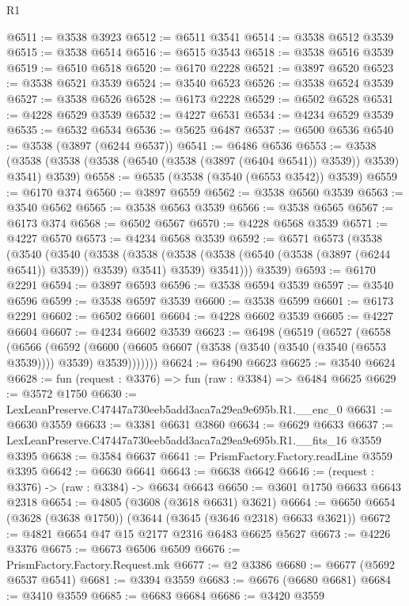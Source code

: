\begin{lexlean}{R1}
\begin{coremodule}
@6511 := @3538 @3923
@6512 := @6511 @3541
@6514 := @3538 @6512 @3539
@6515 := @3538 @6514
@6516 := @6515 @3543
@6518 := @3538 @6516 @3539
@6519 := @6510 @6518
@6520 := @6170 @2228
@6521 := @3897 @6520
@6523 := @3538 @6521 @3539
@6524 := @3540 @6523
@6526 := @3538 @6524 @3539
@6527 := @3538 @6526
@6528 := @6173 @2228
@6529 := @6502 @6528
@6531 := @4228 @6529 @3539
@6532 := @4227 @6531
@6534 := @4234 @6529 @3539
@6535 := @6532 @6534
@6536 := @5625 @6487
@6537 := @6500 @6536
@6540 := @3538 (@3897 (@6244 @6537))
@6541 := @6486 @6536
@6553 := @3538 (@3538 (@3538 (@3538 (@6540 (@3538 (@3897 (@6404 @6541)) @3539)) @3539) @3541) @3539)
@6558 := @6535 (@3538 (@3540 (@6553 @3542)) @3539)
@6559 := @6170 @374
@6560 := @3897 @6559
@6562 := @3538 @6560 @3539
@6563 := @3540 @6562
@6565 := @3538 @6563 @3539
@6566 := @3538 @6565
@6567 := @6173 @374
@6568 := @6502 @6567
@6570 := @4228 @6568 @3539
@6571 := @4227 @6570
@6573 := @4234 @6568 @3539
@6592 := @6571
    @6573
    (@3538
      (@3540
        (@3540
          (@3538
            (@3538 (@3538 (@3538 (@6540 (@3538 (@3897 (@6244 @6541)) @3539)) @3539) @3541) @3539)
            @3541)))
      @3539)
@6593 := @6170 @2291
@6594 := @3897 @6593
@6596 := @3538 @6594 @3539
@6597 := @3540 @6596
@6599 := @3538 @6597 @3539
@6600 := @3538 @6599
@6601 := @6173 @2291
@6602 := @6502 @6601
@6604 := @4228 @6602 @3539
@6605 := @4227 @6604
@6607 := @4234 @6602 @3539
@6623 := @6498
    (@6519
      (@6527
        (@6558
          (@6566
            (@6592
              (@6600 (@6605 @6607 (@3538 (@3540 (@3540 (@3540 (@6553 @3539)))) @3539) @3539)))))))
@6624 := @6490 @6623
@6625 := @3540 @6624
@6628 := fun (request : @3376) => fun (raw : @3384) => @6484 @6625
@6629 := @3572 @1750
@6630 := LexLeanPreserve.C47447a730eeb5add3aca7a29ea9e695b.R1.__enc_0
@6631 := @6630 @3559
@6633 := @3381 @6631 @3860
@6634 := @6629 @6633
@6637 := LexLeanPreserve.C47447a730eeb5add3aca7a29ea9e695b.R1.__fits_16 @3559 @3395
@6638 := @3584 @6637
@6641 := PrismFactory.Factory.readLine @3559 @3395
@6642 := @6630 @6641
@6643 := @6638 @6642
@6646 := (request : @3376) -> (raw : @3384) -> @6634 @6643
@6650 := @3601 @1750 @6633 @6643 @2318
@6654 := @4805 (@3608 (@3618 @6631) @3621)
@6664 := @6650 @6654 (@3628 (@3638 @1750)) (@3644 (@3645 (@3646 @2318) @6633 @3621))
@6672 := @4821 @6654 @47 @15 @2177 @2316 @6483 @6625 @5627
@6673 := @4226 @3376
@6675 := @6673 @6506 @6509
@6676 := PrismFactory.Factory.Request.mk
@6677 := @2 @3386
@6680 := @6677 (@5692 @6537 @6541)
@6681 := @3394 @3559
@6683 := @6676 (@6680 @6681)
@6684 := @3410 @3559
@6685 := @6683 @6684
@6686 := @3420 @3559

\end{coremodule}
\end{lexlean}
